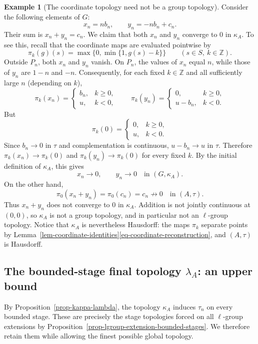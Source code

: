 \documentclass[preprint,3p]{elsarticle}
\theoremstyle{plain}
\theoremstyle{definition}
\newtheorem{exmp}[thm]{Example}
\numberwithin{equation}{section}
\begin{document}
\begin{exmp}[The coordinate topology need not be a group topology]
Consider the following elements of $G$:
\[
 x_n=n b_n,\qquad y_n=-n b_n+c_n.
\]
Their sum is $x_n+y_n=c_n$.  We claim that both $x_n$ and $y_n$
converge to $0$ in $\kappa_A$.
To see this, recall that the coordinate maps are evaluated pointwise
by
\[
 \pi_k(g)(s)=\max\{0,\min\{1,g(s)-k\}\}
 \qquad(s\in S,\ k\in\mathbb Z).
\]
Outside $P_n$, both $x_n$ and $y_n$ vanish.  On $P_n$, the values of
$x_n$ equal $n$, while those of $y_n$ are $1-n$ and $-n$.
Consequently, for each fixed $k\in\mathbb Z$ and all sufficiently
large $n$ (depending on $k$),
\[
 \pi_k(x_n)=
 \begin{cases}
 b_n,&k\geq0,\\
 u,&k<0,
 \end{cases}
 \qquad
 \pi_k(y_n)=
 \begin{cases}
 0,&k\geq0,\\
 u-b_n,&k<0.
 \end{cases}
\]
But
\begin{equation}
\label{eq-zero-coordinate-values}
 \pi_k(0)=
 \begin{cases}
 0,&k\geq0,\\
 u,&k<0.
 \end{cases}
\end{equation}
Since $b_n\to0$ in $\tau$ and complementation is continuous,
$u-b_n\to u$ in $\tau$.  Therefore
$\pi_k(x_n)\to\pi_k(0)$ and
$\pi_k(y_n)\to\pi_k(0)$ for every fixed $k$.
By the initial definition of $\kappa_A$, this gives
\[
 x_n\to0,\qquad y_n\to0
 \quad\text{in }(G,\kappa_A).
\]
On the other hand,
\[
 \pi_0(x_n+y_n)=\pi_0(c_n)=c_n\not\to0
 \quad\text{in }(A,\tau).
\]
Thus $x_n+y_n$ does not converge to $0$ in $\kappa_A$.
Addition is not jointly continuous at $(0,0)$, so $\kappa_A$
is not a group topology, and in particular not an
$\ell$-group topology.  Notice that $\kappa_A$ is nevertheless
Hausdorff: the maps $\pi_k$ separate points by
Lemma~\ref{lem-coordinate-identities}\ref{eq-coordinate-reconstruction},
and $(A,\tau)$ is Hausdorff.
\end{exmp}

\subsection{The bounded-stage final topology
\texorpdfstring{$\lambda_A$}{lambda\_A}: an upper bound}

By Proposition~\ref{prop-kappa-lambda}, the topology $\kappa_A$
induces $\tau_n$ on every bounded stage.  These are precisely
the stage topologies forced on all $\ell$-group extensions by
Proposition~\ref{prop-lgroup-extension-bounded-stages}.
We therefore retain them while allowing the finest possible
global topology.
\end{document}
